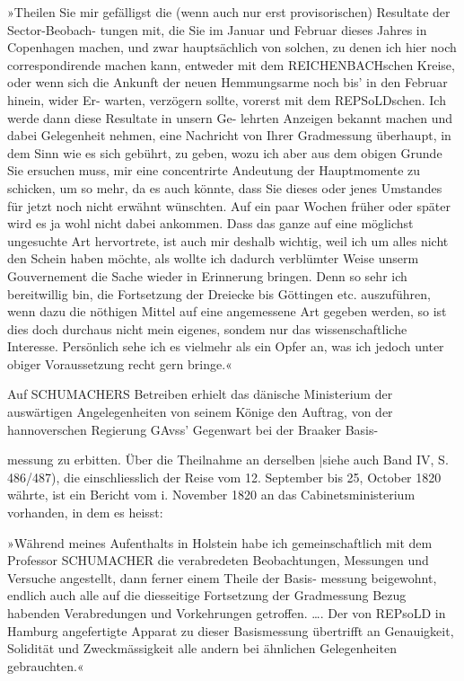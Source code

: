\documentclass[12pt,a4paper]{article}
\theoremstyle{plain}
\theoremstyle{definition}
\theoremstyle{remark}
\begin{document}
\noindent
»Theilen Sie mir gefälligst die (wenn auch nur erst provisorischen) Resultate der Sector-Beobach-
tungen mit, die Sie im Januar und Februar dieses Jahres in Copenhagen machen, und zwar hauptsächlich
von solchen, zu denen ich hier noch correspondirende machen kann, entweder mit dem REICHENBACHschen
Kreise, oder wenn sich die Ankunft der neuen Hemmungsarme noch bis' in den Februar hinein, wider Er-
warten, verzögern sollte, vorerst mit dem REPSoLDschen. Ich werde dann diese Resultate in unsern Ge-
lehrten Anzeigen bekannt machen und dabei Gelegenheit nehmen, eine Nachricht von Ihrer Gradmessung
überhaupt, in dem Sinn wie es sich gebührt, zu geben, wozu ich aber aus dem obigen Grunde Sie ersuchen
muss, mir eine concentrirte Andeutung der Hauptmomente zu schicken, um so mehr, da es auch könnte,
dass Sie dieses oder jenes Umstandes für jetzt noch nicht erwähnt wünschten. Auf ein paar Wochen früher
oder später wird es ja wohl nicht dabei ankommen. Dass das ganze auf eine möglichst ungesuchte
Art hervortrete, ist auch mir deshalb wichtig, weil ich um alles nicht den Schein haben möchte, als wollte
ich dadurch verblümter Weise unserm Gouvernement die Sache wieder in Erinnerung bringen. Denn so sehr
ich bereitwillig bin, die Fortsetzung der Dreiecke bis Göttingen etc. auszuführen, wenn dazu die nöthigen
Mittel auf eine angemessene Art gegeben werden, so ist dies doch durchaus nicht mein eigenes, sondem
nur das wissenschaftliche Interesse. Persönlich sehe ich es vielmehr als ein Opfer an, was ich jedoch unter
obiger Voraussetzung recht gern bringe.«

\noindent
Auf SCHUMACHERS Betreiben erhielt das dänische Ministerium der auswärtigen Angelegenheiten von
seinem Könige den Auftrag, von der hannoverschen Regierung GAvss' Gegenwart bei der Braaker Basis-

\noindent

\noindent

\noindent
messung zu erbitten. Über die Theilnahme an derselben |siehe auch Band IV, S. 486/487), die einschliesslich
der Reise vom 12. September bis 25, October 1820 währte, ist ein Bericht vom i. November 1820 an das
Cabinetsministerium vorhanden, in dem es heisst:

\noindent
»Während meines Aufenthalts in Holstein habe ich gemeinschaftlich mit dem Professor SCHUMACHER
die verabredeten Beobachtungen, Messungen und Versuche angestellt, dann ferner einem Theile der Basis-
messung beigewohnt, endlich auch alle auf die diesseitige Fortsetzung der Gradmessung Bezug habenden
Verabredungen und Vorkehrungen getroffen. \ldots. Der von REPsoLD in Hamburg angefertigte Apparat zu
dieser Basismessung übertrifft an Genauigkeit, Solidität und Zweckmässigkeit alle andern bei ähnlichen
Gelegenheiten gebrauchten.«
\end{document}
